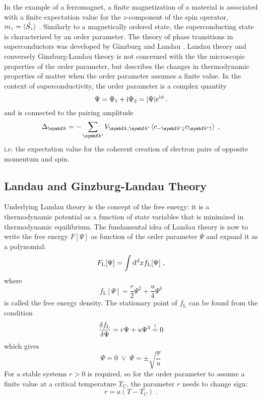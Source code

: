 \documentclass[../notes.tex]{subfiles}
\begin{document}
In the example of a ferromagnet, a finite magnetization of a material is associated with a finite expectation value for the \(z\)-component of the spin operator, \(m_z = \braket{\hat{S_z}}\) \cite{landauTheoryPhaseTransitions1937}.
Similarly to a magnetically ordered state, the superconducting state is characterized by an order parameter.
The theory of phase transitions in superconductors was developed by Ginzburg and Landau \cite{ginzburgTheorySuperconductivity1950}.
Landau theory and conversely Ginzburg-Landau theory is not concerned with the the microscopic properties of the order parameter, but describes the changes in thermodynamic properties of matter when the order parameter assumes a finite value.
In the context of superconductivity, the order parameter is a complex quantity
\begin{equation}
	\Psi = \Psi_1 + \mathrm{i} \Psi_2 = \vert \Psi \vert e^{\mathrm{i} \phi} \,.
\end{equation}
and is connected to the pairing amplitude 
\begin{equation}
	\Delta_{\vb{k}} = -\sum_{\vb{k}^{\prime}} V_{\vb{k}, \vb{k}^{\prime}} \braket{ c_{-\vb{k}^{\prime} \downarrow} c_{\vb{k}^{\prime} \uparrow}} \;,
\end{equation}
i.e. the expectation value for the coherent creation of electron pairs of opposite momentum and spin.

\subsection*{Landau and Ginzburg-Landau Theory}\label{sub:Landau and Ginzburg-Landau Theory}

Underlying Landau theory is the concept of the free energy: it is a thermodynamic potential as a function of state variables that is minimized in thermodynamic equilibrium.
The fundamental idea of Landau theory is now to write the free energy \(F[\Psi]\) as function of the order parameter \(\Psi\) and expand it as a polynomial:
\begin{equation}
	F_{\mathrm{L}}[\Psi] = \int \odif[order={d}]{x} f_{\mathrm{L}} [\Psi] \;,
\end{equation}
where
\begin{equation}
	f_{\mathrm{L}} [\Psi] = \frac{r}{2} \Psi^2 + \frac{u}{4} \Psi^4
\end{equation}
is called the free energy density.
The stationary point of \(f_{\mathrm{L}}\) can be found from the condition
\begin{equation}
	\fdv{f_{\mathrm{L}}}{\Psi} =  r \Psi + u \Psi^3 \overset{!}{=} 0
\end{equation}
which gives
\begin{equation}
	\Psi = 0 \; \lor \; \Psi = \pm \sqrt{\frac{r}{u}}
\end{equation}
For a stable systems \(r > 0\) is required, so for the order parameter to assume a finite value at a critical temperature \(T_{\mathrm{C}}\), the parameter \(r\) needs to change sign:
\begin{equation}
	r = a(T - T_C) \;.
\end{equation}
\end{document}
